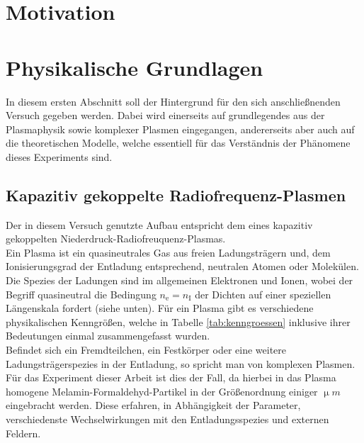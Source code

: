 \documentclass[numbers=noenddot,a4paper]{scrartcl}
\newcommand{\ix}[1]{_\text{#1}}
\begin{document}
	\thispagestyle{empty}

	\newpage

	\tableofcontents

	\newpage

	\section{Motivation}\label{sec:einleitung}

	\newpage

	\section{Physikalische Grundlagen}\label{sec:physg}

		In diesem ersten Abschnitt soll der Hintergrund f\"ur den sich anschlie{\ss}nenden Versuch gegeben werden. Dabei wird einerseits auf grundlegendes aus der Plasmaphysik sowie komplexer Plasmen eingegangen, andererseits aber auch auf die theoretischen Modelle, welche essentiell f\"ur das Verst\"andnis der Ph\"anomene dieses Experiments sind.

		\subsection{Kapazitiv gekoppelte Radiofrequenz-Plasmen} \label{sub:kaprfplasm}

			Der in diesem Versuch genutzte Aufbau entspricht dem eines kapazitiv gekoppelten Niederdruck-Radiofreuquenz-Plasmas.\\
			Ein Plasma ist ein quasineutrales Gas aus freien Ladungsträgern und, dem Ionisierungsgrad der Entladung entsprechend, neutralen Atomen oder Molekülen. Die Spezies der Ladungen sind im allgemeinen Elektronen und Ionen, wobei der Begriff quasineutral die Bedingung $n\ix{e}=n\ix{I}$ der Dichten auf einer speziellen Längenskala fordert (siehe unten). Für ein Plasma gibt es verschiedene physikalischen Kenngrößen, welche in Tabelle \ref{tab:kenngroessen} inklusive ihrer Bedeutungen einmal zusammengefasst wurden.\\
			Befindet sich ein Fremdteilchen, ein Festkörper oder eine weitere Ladungsträgerspezies in der Entladung, so spricht man von komplexen Plasmen. Für das Experiment dieser Arbeit ist dies der Fall, da hierbei in das Plasma homogene Melamin-Formaldehyd-Partikel in der Größenordnung einiger $\unit{\upmu m}$ eingebracht werden. Diese erfahren, in Abhängigkeit der Parameter, verschiedenste Wechselwirkungen mit den Entladungsspezies und externen Feldern.
\end{document}
